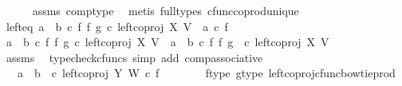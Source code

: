 \begin{isabellebody}
\ \ \ \ \isamarkupfalse%
\ assms\ comp{\isacharunderscore}{\kern0pt}type\ \isamarkupfalse%
\ {\isacharparenleft}{\kern0pt}metis\ {\isacharparenleft}{\kern0pt}full{\isacharunderscore}{\kern0pt}types{\isacharparenright}{\kern0pt}\ cfunc{\isacharunderscore}{\kern0pt}coprod{\isacharunderscore}{\kern0pt}unique{\isacharparenright}{\kern0pt}\ \isanewline
\isanewline
\ \ \isamarkupfalse%
\ left{\isacharunderscore}{\kern0pt}eq{\isacharcolon}{\kern0pt}\ {\isachardoublequoteopen}{\isacharparenleft}{\kern0pt}a\ {\isasymamalg}\ b\ {\isasymcirc}\isactrlsub c\ f\ {\isasymbowtie}\isactrlsub f\ g{\isacharparenright}{\kern0pt}\ {\isasymcirc}\isactrlsub c\ left{\isacharunderscore}{\kern0pt}coproj\ X\ V\ {\isacharequal}{\kern0pt}\ {\isacharparenleft}{\kern0pt}a\ {\isasymcirc}\isactrlsub c\ f{\isacharparenright}{\kern0pt}{\isachardoublequoteclose}\isanewline
\ \ \isamarkupfalse%
\ {\isacharminus}{\kern0pt}\ \isanewline
\ \ \ \ \isamarkupfalse%
\ {\isachardoublequoteopen}{\isacharparenleft}{\kern0pt}a\ {\isasymamalg}\ b\ {\isasymcirc}\isactrlsub c\ f\ {\isasymbowtie}\isactrlsub f\ g{\isacharparenright}{\kern0pt}\ {\isasymcirc}\isactrlsub c\ left{\isacharunderscore}{\kern0pt}coproj\ X\ V\ {\isacharequal}{\kern0pt}\ {\isacharparenleft}{\kern0pt}a\ {\isasymamalg}\ b{\isacharparenright}{\kern0pt}\ {\isasymcirc}\isactrlsub c\ {\isacharparenleft}{\kern0pt}f\ {\isasymbowtie}\isactrlsub f\ g{\isacharparenright}{\kern0pt}\ \ {\isasymcirc}\isactrlsub c\ left{\isacharunderscore}{\kern0pt}coproj\ X\ V{\isachardoublequoteclose}\isanewline
\ \ \ \ \ \ \isamarkupfalse%
\ assms\ \isamarkupfalse%
\ {\isacharparenleft}{\kern0pt}typecheck{\isacharunderscore}{\kern0pt}cfuncs{\isacharcomma}{\kern0pt}\ simp\ add{\isacharcolon}{\kern0pt}\ comp{\isacharunderscore}{\kern0pt}associative{}{\isacharparenright}{\kern0pt}\isanewline
\ \ \ \ \isamarkupfalse%
\ \isamarkupfalse%
\ {\isachardoublequoteopen}{\isachardot}{\kern0pt}{\isachardot}{\kern0pt}{\isachardot}{\kern0pt}\ {\isacharequal}{\kern0pt}\ {\isacharparenleft}{\kern0pt}a\ {\isasymamalg}\ b{\isacharparenright}{\kern0pt}\ \ {\isasymcirc}\isactrlsub c\ left{\isacharunderscore}{\kern0pt}coproj\ Y\ W\ {\isasymcirc}\isactrlsub c\ f{\isachardoublequoteclose}\isanewline
\ \ \ \ \ \ \isamarkupfalse%
\ f{\isacharunderscore}{\kern0pt}type\ g{\isacharunderscore}{\kern0pt}type\ left{\isacharunderscore}{\kern0pt}coproj{\isacharunderscore}{\kern0pt}cfunc{\isacharunderscore}{\kern0pt}bowtie{\isacharunderscore}{\kern0pt}prod\ \isamarkupfalse%

\end{isabellebody}
